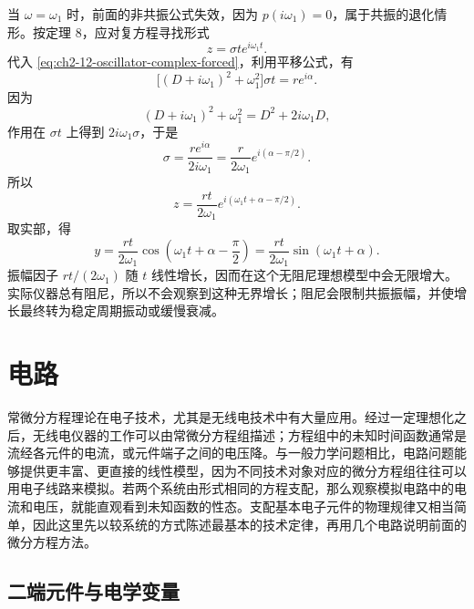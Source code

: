 当 \(\omega=\omega_1\) 时，前面的非共振公式失效，因为 \(p(i\omega_1)=0\)，属于共振的退化情形。按定理 8，应对复方程寻找形式
\begin{equation}
 z=\sigma t e^{i\omega_1t}.
 \label{eq:ch2-12-resonance-ansatz}
\end{equation}
代入 \eqref{eq:ch2-12-oscillator-complex-forced}，利用平移公式，有
\begin{equation}
 \bigl[(D+i\omega_1)^2+\omega_1^2\bigr]\sigma t
 =r e^{i\alpha}.
 \label{eq:ch2-12-resonance-condition}
\end{equation}
因为
\[
 (D+i\omega_1)^2+\omega_1^2=D^2+2i\omega_1D,
\]
作用在 \(\sigma t\) 上得到 \(2i\omega_1\sigma\)，于是
\begin{equation}
 \sigma=\frac{re^{i\alpha}}{2i\omega_1}
 =\frac{r}{2\omega_1}e^{i(\alpha-\pi/2)}.
 \label{eq:ch2-12-resonance-amplitude}
\end{equation}
所以
\begin{equation}
 z=\frac{rt}{2\omega_1}e^{i(\omega_1t+\alpha-\pi/2)}.
 \label{eq:ch2-12-resonance-complex-solution}
\end{equation}
取实部，得
\begin{equation}
 y=\frac{rt}{2\omega_1}
 \cos\left(\omega_1t+\alpha-\frac{\pi}{2}\right)
 =\frac{rt}{2\omega_1}\sin(\omega_1t+\alpha).
 \label{eq:ch2-12-resonance-real-solution}
\end{equation}
振幅因子 \(rt/(2\omega_1)\) 随 \(t\) 线性增长，因而在这个无阻尼理想模型中会无限增大。实际仪器总有阻尼，所以不会观察到这种无界增长；阻尼会限制共振振幅，并使增长最终转为稳定周期振动或缓慢衰减。

\section{电路}

常微分方程理论在电子技术，尤其是无线电技术中有大量应用。经过一定理想化之后，无线电仪器的工作可以由常微分方程组描述；方程组中的未知时间函数通常是流经各元件的电流，或元件端子之间的电压降。与一般力学问题相比，电路问题能够提供更丰富、更直接的线性模型，因为不同技术对象对应的微分方程组往往可以用电子线路来模拟。若两个系统由形式相同的方程支配，那么观察模拟电路中的电流和电压，就能直观看到未知函数的性态。支配基本电子元件的物理规律又相当简单，因此这里先以较系统的方式陈述最基本的技术定律，再用几个电路说明前面的微分方程方法。

\subsection*{二端元件与电学变量}

